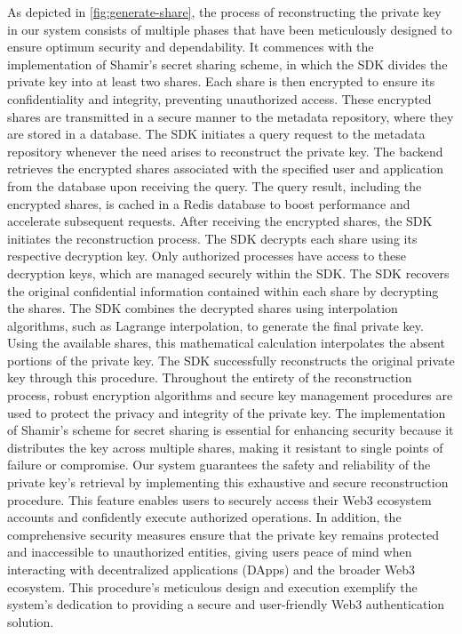 \documentclass[../Main.tex]{subfiles}
\begin{document}
As depicted in \ref{fig:generate-share}, the process of reconstructing the private key in our system consists of multiple phases that have been meticulously designed to ensure optimum security and dependability. It commences with the implementation of Shamir's secret sharing scheme, in which the SDK divides the private key into at least two shares. Each share is then encrypted to ensure its confidentiality and integrity, preventing unauthorized access. These encrypted shares are transmitted in a secure manner to the metadata repository, where they are stored in a database. The SDK initiates a query request to the metadata repository whenever the need arises to reconstruct the private key. The backend retrieves the encrypted shares associated with the specified user and application from the database upon receiving the query. The query result, including the encrypted shares, is cached in a Redis database to boost performance and accelerate subsequent requests. After receiving the encrypted shares, the SDK initiates the reconstruction process. The SDK decrypts each share using its respective decryption key. Only authorized processes have access to these decryption keys, which are managed securely within the SDK. The SDK recovers the original confidential information contained within each share by decrypting the shares. The SDK combines the decrypted shares using interpolation algorithms, such as Lagrange interpolation, to generate the final private key. Using the available shares, this mathematical calculation interpolates the absent portions of the private key. The SDK successfully reconstructs the original private key through this procedure. Throughout the entirety of the reconstruction process, robust encryption algorithms and secure key management procedures are used to protect the privacy and integrity of the private key. The implementation of Shamir's scheme for secret sharing is essential for enhancing security because it distributes the key across multiple shares, making it resistant to single points of failure or compromise. Our system guarantees the safety and reliability of the private key's retrieval by implementing this exhaustive and secure reconstruction procedure. This feature enables users to securely access their Web3 ecosystem accounts and confidently execute authorized operations. In addition, the comprehensive security measures ensure that the private key remains protected and inaccessible to unauthorized entities, giving users peace of mind when interacting with decentralized applications (DApps) and the broader Web3 ecosystem. This procedure's meticulous design and execution exemplify the system's dedication to providing a secure and user-friendly Web3 authentication solution.
\end{document}
